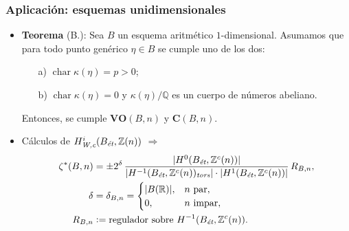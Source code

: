 \documentclass[handout]{beamer}
\newcommand{\QQ}{\mathbb{Q}}
\newcommand{\RR}{\mathbb{R}}
\newcommand{\ZZ}{\mathbb{Z}}
\DeclareMathOperator{\fchar}{char}
\newcommand{\dfn}{\mathrel{\mathop:}=}
\newcommand{\et}{\text{\it ét}}
\newcommand{\tors}{\text{\it tors}}
\newcommand{\Wc}{\text{\it W,c}}
\begin{document}

\begin{frame}
  \frametitle{Aplicación: esquemas unidimensionales}

  \begin{itemize}
  \item<2-> \textbf{Teorema} (B.): Sea $B$ un esquema aritmético
    $1$-dimensional. Asumamos que para todo punto genérico $\eta \in B$ se
    cumple uno de los dos:
    \begin{enumerate}
    \item[a)] $\fchar \kappa (\eta) = p > 0$;

    \item[b)] $\fchar \kappa (\eta) = 0$ y $\kappa (\eta)/\QQ$ es un cuerpo de
      números abeliano.
    \end{enumerate}

    Entonces, se cumple $\mathbf{VO} (B,n)$ y $\mathbf{C} (B,n)$.

  \item<3-> Cálculos de $H^i_\Wc (B_\et, \ZZ(n))$ $\Longrightarrow$
    \begin{align*}
      \zeta^* (B,n) & =
                      \pm 2^\delta\,\frac{|H^0 (B_\et, \ZZ^c (n))|}{|H^{-1} (B_\et, \ZZ^c (n))_\tors| \cdot |H^1 (B_\et, \ZZ^c (n))|}\,R_{B,n}, \\
                      \delta & = \delta_{B,n} =
                               \begin{cases}
                                 |B (\RR)|, & n \text{ par}, \\
                                 0, & n \text{ impar},
                               \end{cases}\\
      R_{B,n} & \dfn \text{regulador sobre }H^{-1} (B_\et, \ZZ^c (n)).
    \end{align*}
  \end{itemize}
\end{frame}

\end{document}
